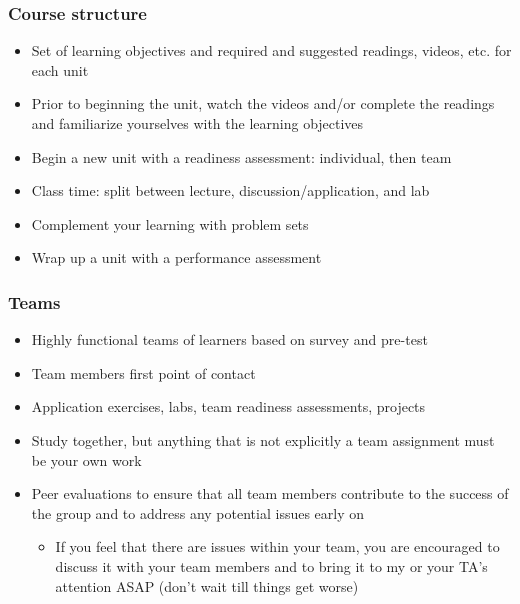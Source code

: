 \documentclass[11pt,containsverbatim,handout,xcolor=xelatex,dvipsnames,table]{beamer}
\begin{document}
\begin{frame}
\frametitle{Course structure}

\begin{itemize}[<alert@+>]
\item Set of learning objectives and required and suggested readings, videos, etc. for each unit
\item Prior to beginning the unit, watch the videos and/or complete the readings and familiarize yourselves with the learning objectives
\item Begin a new unit with a readiness assessment: individual, then team 
\item Class time: split between lecture, discussion/application, and lab
\item Complement your learning with problem sets
\item Wrap up a unit with a performance assessment
\end{itemize}

\end{frame}


\begin{frame}
\frametitle{Teams}

\begin{itemize}
\item Highly functional teams of learners based on survey and pre-test

\item Team members first point of contact

\item Application exercises, labs, team readiness assessments, projects

\item Study together, but anything that is not explicitly a team assignment must be your own work

\item Peer evaluations to ensure that all team members contribute to the success of the group and to address any potential issues early on
\begin{itemize}
\item If you feel that there are issues within your team, you are encouraged to discuss it with your team members and to bring it to my or your TA's attention ASAP (don't wait till things get worse)
\end{itemize}

\end{itemize}

\end{frame}
\end{document}

